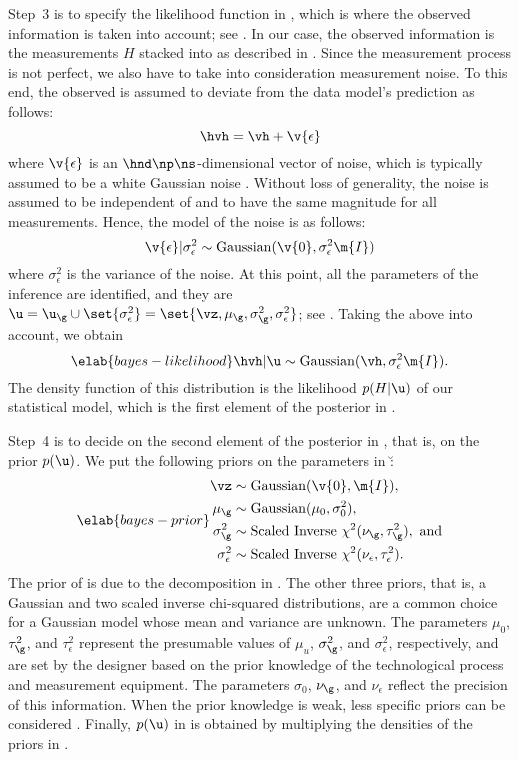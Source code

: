 Step~3 is to specify the likelihood function in , which is
where the observed information is taken into account; see
. In our case, the observed information is the
measurements $H$ stacked into \hvh as described in .
Since the measurement process is not perfect, we also have to take into
consideration measurement noise. To this end, the observed \hvh is assumed to
deviate from the data model's prediction \vh as follows:
\[
  \hvh = \vh + \v{\epsilon}
\]
where $\v{\epsilon}$ is an $\hnd \np \ns$-dimensional vector of noise, which is
typically assumed to be a white Gaussian noise \cite{rasmussen2006,
marzouk2009}. Without loss of generality, the noise is assumed to be independent
of \g and to have the same magnitude for all measurements. Hence, the model of
the noise is as follows:
\[
  \v{\epsilon} | \sigma^2_\epsilon \sim \mathrm{Gaussian}(\v{0}, \sigma^2_\epsilon \m{I})
\]
where $\sigma^2_\epsilon$ is the variance of the noise. At this point, all the
parameters of the inference are identified, and they are $\u = \u_\g \cup
\set{\sigma_\epsilon^2} = \set{\vz, \mu_\g, \sigma_\g^2, \sigma_\epsilon^2}$;
see . Taking the above into account, we obtain
\begin{equation} \elab{bayes-likelihood}
  \hvh | \u \sim \mathrm{Gaussian}(\vh, \sigma_\epsilon^2 \m{I}).
\end{equation}
The density function of this distribution is the likelihood $p(H | \u)$ of our
statistical model, which is the first element of the posterior in
.

Step~4 is to decide on the second element of the posterior in
, that is, on the prior $p(\u)$. We put the following priors
on the parameters in \u:
\begin{align} \elab{bayes-prior}
  \begin{split}
    \vz               & \sim \mathrm{Gaussian}(\v{0}, \m{I}), \\
    \mu_\g            & \sim \mathrm{Gaussian}(\mu_0, \sigma^2_0), \\
    \sigma^2_\g       & \sim \mathrm{Scaled\ Inverse\ } \chi^2(\nu_\g, \tau^2_\g), \text{ and} \\
    \sigma^2_\epsilon & \sim \mathrm{Scaled\ Inverse\ } \chi^2(\nu_\epsilon, \tau^2_\epsilon).
  \end{split}
\end{align}
The prior of \vz is due to the decomposition in . The
other three priors, that is, a Gaussian and two scaled inverse chi-squared
distributions, are a common choice for a Gaussian model whose mean and variance
are unknown. The parameters $\mu_0$, $\tau^2_\g$, and $\tau^2_\epsilon$
represent the presumable values of $\mu_u$, $\sigma^2_\g$, and
$\sigma^2_\epsilon$, respectively, and are set by the designer based on the
prior knowledge of the technological process and measurement equipment. The
parameters $\sigma_0$, $\nu_\g$, and $\nu_\epsilon$ reflect the precision of
this information. When the prior knowledge is weak, less specific priors can be
considered \cite{gelman2013}. Finally, $p(\u)$ in  is
obtained by multiplying the densities of the priors in .

